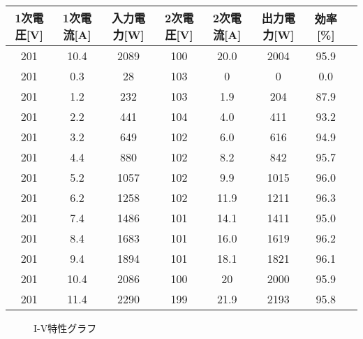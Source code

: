 \documentclass[a4paper,11pt,xelatex,ja=standard]{bxjsarticle}
\begin{document}
        \begin{table}[H]
            \centering
            \begin{tabular}{|c|c|c|c|c|c|c|c|}
            \hline
            1次電圧[V] & 1次電流[A] & 入力電力[W] & 2次電圧[V] & 2次電流[A] & 出力電力[W] & 効率[\%] \\
            \hline\hline
            201 & 10.4 & 2089 & 100 & 20.0 & 2004 & 95.9 \\
            201 & 0.3  & 28   & 103 & 0    & 0    & 0.0  \\
            201 & 1.2  & 232  & 103 & 1.9  & 204  & 87.9 \\
            201 & 2.2  & 441  & 104 & 4.0  & 411  & 93.2 \\
            201 & 3.2  & 649  & 102 & 6.0  & 616  & 94.9 \\
            201 & 4.4  & 880  & 102 & 8.2  & 842  & 95.7 \\
            201 & 5.2  & 1057 & 102 & 9.9  & 1015 & 96.0 \\
            201 & 6.2  & 1258 & 102 & 11.9 & 1211 & 96.3 \\
            201 & 7.4  & 1486 & 101 & 14.1 & 1411 & 95.0 \\
            201 & 8.4  & 1683 & 101 & 16.0 & 1619 & 96.2 \\
            201 & 9.4  & 1894 & 101 & 18.1 & 1821 & 96.1 \\
            201 & 10.4 & 2086 & 100 & 20   & 2000 & 95.9 \\
            201 & 11.4 & 2290 & 199 & 21.9 & 2193 & 95.8 \\
            \hline
            \end{tabular}
        \end{table}

        \begin{figure}[H]
            \centering
            \caption{I-V特性グラフ}
        \end{figure}
\end{document}
